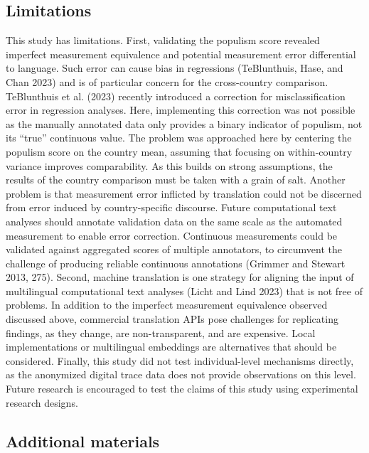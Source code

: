 \documentclass[
]{ccr}
\begin{document}
\hypertarget{limitations}{%
\subsection{Limitations}\label{limitations}}

This study has limitations. First, validating the populism score
revealed imperfect measurement equivalence and potential measurement
error differential to language. Such error can cause bias in regressions
(TeBlunthuis, Hase, and Chan 2023) and is of particular concern for the
cross-country comparison. TeBlunthuis et al. (2023) recently introduced
a correction for misclassification error in regression analyses. Here,
implementing this correction was not possible as the manually annotated
data only provides a binary indicator of populism, not its ``true''
continuous value. The problem was approached here by centering the
populism score on the country mean, assuming that focusing on
within-country variance improves comparability. As this builds on strong
assumptions, the results of the country comparison must be taken with a
grain of salt. Another problem is that measurement error inflicted by
translation could not be discerned from error induced by
country-specific discourse. Future computational text analyses should
annotate validation data on the same scale as the automated measurement
to enable error correction. Continuous measurements could be validated
against aggregated scores of multiple annotators, to circumvent the
challenge of producing reliable continuous annotations (Grimmer and
Stewart 2013, 275). Second, machine translation is one strategy for
aligning the input of multilingual computational text analyses (Licht
and Lind 2023) that is not free of problems. In addition to the
imperfect measurement equivalence observed discussed above, commercial
translation APIs pose challenges for replicating findings, as they
change, are non-transparent, and are expensive. Local implementations or
multilingual embeddings are alternatives that should be considered.
Finally, this study did not test individual-level mechanisms directly,
as the anonymized digital trace data does not provide observations on
this level. Future research is encouraged to test the claims of this
study using experimental research designs.

\hypertarget{additional-materials}{%
\subsection{Additional materials}\label{additional-materials}}
\end{document}
